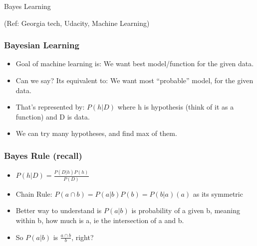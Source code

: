 \begin{frame}[fragile]\frametitle{}
\begin{center}
{\Large Bayes Learning}

{\tiny (Ref: Georgia tech, Udacity, Machine Learning)}

\end{center}


\end{frame}

\begin{frame}[fragile]\frametitle{Bayesian Learning}

\begin{itemize}
\item Goal of machine learning is: We want best model/function for the given data. 
\item Can we say? Its equivalent to: We want most ``probable'' model, for the given data.
\item That's represented by: $P(h|D)$ where h is hypothesis (think of it as a function) and D is data.
\item We can try many hypotheses, and find max of them.

\end{itemize}

\end{frame}

\begin{frame}[fragile]\frametitle{Bayes Rule (recall)}

\begin{itemize}
\item $P(h|D) = \frac{P(D|h)P(h)}{P(D)}$
\item Chain Rule: $P(a \cap b) = P(a|b)P(b) = P(b|a)(a)$ as its symmetric
\item Better way to understand is $P(a|b)$ is probability of a given b, meaning within b, how much is a, ie the intersection of a and b. 
\item So $P(a|b)$ is $\frac{a \cap b}{b}$, right?
\end{itemize}

\end{frame}

